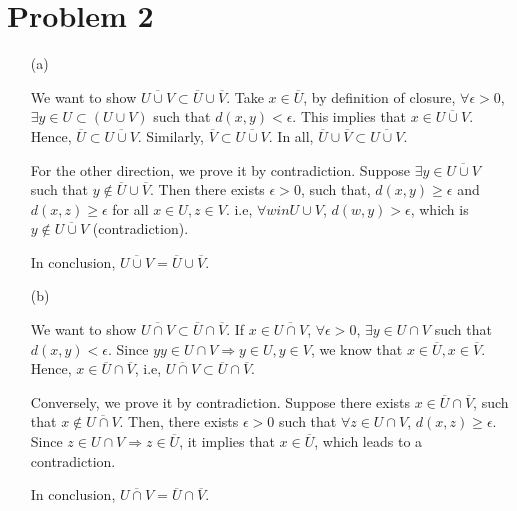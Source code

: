 \documentclass[12pt]{article}
\begin{document}
\section*{Problem 2}

\begin{enumerate}
\item [(a)]

We want to show $\overline{U\cup V} \subset \overline U \cup \overline V$. Take $x \in \overline U$, by definition of closure, $\forall \epsilon >0$, $\exists y \in U\subset (U\cup V)$ such that  $d(x, y) < \epsilon$. This implies that $x \in \overline{U\cup V}$. Hence, $\overline U \subset \overline{U\cup V}$. Similarly, $\overline V \subset \overline{U\cup V}$. In all, $\overline U \cup \overline V \subset \overline{U\cup V}$.

For the other direction, we prove it by contradiction. Suppose $\exists y \in \overline{U \cup V}$ such that $y \notin \overline U \cup \overline V$. Then there exists $\epsilon > 0$, such that, $d(x, y) \geqslant \epsilon$ and $d(x, z) \geqslant \epsilon$ for all $x\in U, z \in V$. i.e, $\forall w in U\cup V$, $d(w, y) > \epsilon$, which is $y\notin \overline{U \cup V}$ (contradiction).

In conclusion, $\overline{U\cup V} = \overline U \cup \overline V$.

\item [(b)]

We want to show $\overline{U \cap V} \subset \overline U \cap \overline V$. If $x\in \overline{U\cap V}$, $\forall \epsilon > 0$, $\exists y \in U\cap V$ such that $d(x, y) < \epsilon$. Since $y y \in U\cap V \Rightarrow y \in U, y \in V$, we know that $x\in \overline U, x \in\overline V$. Hence, $x\in \overline U \cap \overline V$, i.e, $\overline{U \cap V} \subset \overline U \cap \overline V$.

Conversely, we prove it by contradiction. Suppose there exists $x \in \overline U \cap \overline V$, such that $x \notin \overline {U\cap V}$. Then, there exists $\epsilon > 0$ such that $\forall z \in U\cap V$, $d(x, z)\geqslant \epsilon$. Since $z\in U\cap V \Rightarrow z\in \overline U$, it implies that $x\in \overline U$, which leads to a contradiction.

In conclusion, $\overline{U \cap V} = \overline U \cap \overline V$.

\end{enumerate}
\end{document}
